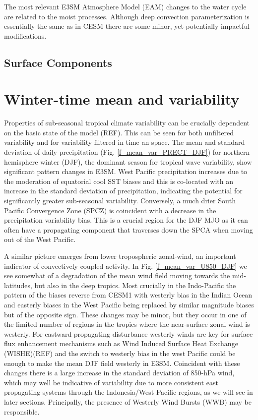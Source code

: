 \documentclass[draft,ms]{AGUTeX}
\begin{document}
\begin{article}
The most relevant E3SM Atmosphere Model (EAM) changes to the water cycle are related to the moist processes. Although deep convection parameterization is essentially the same as in CESM there are some minor, yet potentially impactful modifications. 



\subsection{Surface Components}





\section{Winter-time mean and variability}
Properties of sub-seasonal tropical climate variability can be crucially dependent on the basic state of the model (REF). This can be seen for both unfiltered variability and for variability filtered in time an space. The mean and standard deviation of daily precipitation (Fig. \ref{f_mean_var_PRECT_DJF}) for northern hemisphere winter (DJF), the dominant season for tropical wave variability, show significant pattern changes in E3SM. West Pacific precipitation increases due to the moderation of equatorial cool SST biases and this is co-located with an increase in the standard deviation of precipitation, indicating the potential for significantly greater sub-seasonal variability. Conversely, a much drier South Pacific Convergence Zone (SPCZ) is coincident with a decrease in the precipitation variability bias. This is a crucial region for the DJF MJO as it can often have a propagating component that traverses down the SPCA when moving out of the West Pacific. 

A similar picture emerges from lower tropospheric zonal-wind, an important indicator of convectively coupled activity. In Fig. \ref{f_mean_var_U850_DJF} we see somewhat of a degradation of the mean wind field moving towards the mid-latitudes, but also in the deep tropics. Most crucially in the Indo-Pacific the pattern of the biases reverse from CESM1 with westerly bias in the Indian Ocean and easterly biases in the West Pacific being replaced by similar magnitude biases but of the opposite sign. These changes may be minor, but they occur in one of the limited number of regions in the tropics where the near-surface zonal wind is westerly. For eastward propagating disturbance westerly winds are key for surface flux enhancement mechanisms such as Wind Induced Surface Heat Exchange (WISHE)(REF) and the switch to westerly bias in the west Pacific could be enough to make the mean DJF field westerly in E3SM. Coincident with these changes there is a large increase in the standard deviation of 850-hPa wind, which may well be indicative of variability due to more consistent east propagating systems through the Indonesia/West Pacific regions, as we will see in later sections. Principally, the presence of Westerly Wind Bursts (WWB) may be responsible.


\end{article}
\end{document}
